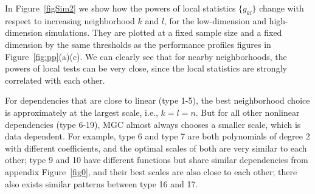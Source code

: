 \documentclass[11pt]{article}
\begin{document}
In Figure~\ref{figSim2} we show how the powers of local statistics $\{g_{kl}\}$ change with respect to increasing neighborhood $k$ and $l$, for the low-dimension and high-dimension simulations. They are plotted at a fixed sample size and a fixed dimension by the same thresholds as the performance profiles figures in Figure~\ref{fig:pp}(a)(c). We can clearly see that for nearby neighborhoods, the powers of local tests can be very close, since the local statistics are strongly correlated with each other. %

For dependencies that are close to linear (type 1-5), the best neighborhood choice is approximately at the largest scale, i.e., $k=l=n$. But for all other nonlinear dependencies (type 6-19), MGC almost always chooses a smaller scale, which is data dependent. For example, type 6 and type 7 are both polynomials of degree 2 with different coefficients, and the optimal scales of both are very similar to each other; type 9 and 10 have different functions but share similar dependencies from appendix Figure~\ref{fig0}, and their best scales are also close to each other; there also exists similar patterns between type 16 and 17.
\end{document}
